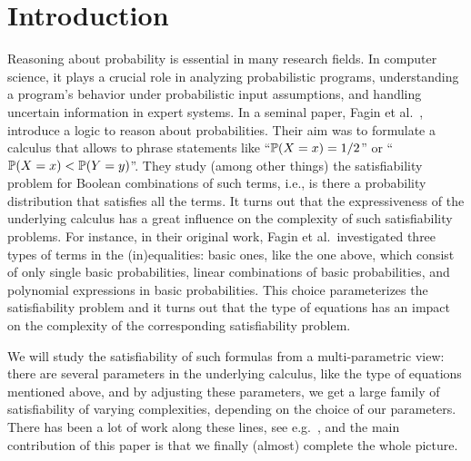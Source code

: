 \documentclass[a4paper,UKenglish,cleveref, autoref, thm-restate]{lipics-v2021}
\newcommand{\compactEquals}[1]{\let\IsInPP=1#1\let\IsInPP=\relax}
\newcommand{\PP}[1]{\mathbb{P}(\compactEquals{#1})}
\begin{document}
\setcounter{footnote}{0}       

\section{Introduction}\label{sec:intro}

Reasoning about probability is essential in many research fields. In computer science, it plays a crucial role in analyzing probabilistic programs, understanding a program's behavior under probabilistic input assumptions, and handling uncertain information in expert systems.
In a seminal paper, Fagin et al.~\cite{fagin1990logic}, introduce a logic to reason about probabilities. Their aim was to formulate a calculus that allows to phrase statements like ``$\PP{X=x} = 1/2$'' or ``$\PP{X = x} < \PP{Y = y}$''. They study (among other things) the satisfiability problem for Boolean combinations of such terms, i.e., is there a probability distribution that satisfies all the terms. It turns out that the expressiveness of the underlying calculus has a great influence on the complexity of such satisfiability problems. For instance, in their original work, Fagin et al.\ investigated three types of terms in the (in)equalities: basic ones, like the one above, which consist of only single basic probabilities, linear combinations of basic probabilities, and polynomial expressions in basic probabilities. This choice parameterizes the satisfiability problem and it turns out that the type of equations has an impact on the complexity of the corresponding satisfiability problem.

We will study the satisfiability of such formulas from a multi-parametric view: there are several parameters in the underlying calculus, like the type of equations mentioned above, and by adjusting these parameters, we get a large family of satisfiability of varying complexities, depending on the choice of our parameters. There has been a lot of work along these lines, see e.g.\ \cite{fagin1990logic, ibeling2020probabilistic, ibeling2022mosse, ibeling2024probabilistic, zander2023ijcai, blaser2024existential, IBELING2024103339,doerflerICLR2025}, and the main contribution of this paper is that we finally (almost) complete the whole picture.
\end{document}
